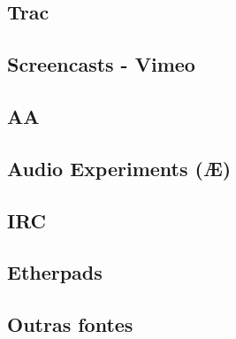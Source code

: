 \subsection{Trac}

\subsection{Screencasts - Vimeo}

\subsection{AA}

\subsection{Audio Experiments (Æ)}

\subsection{IRC}

\subsection{Etherpads}

\subsection{Outras fontes}